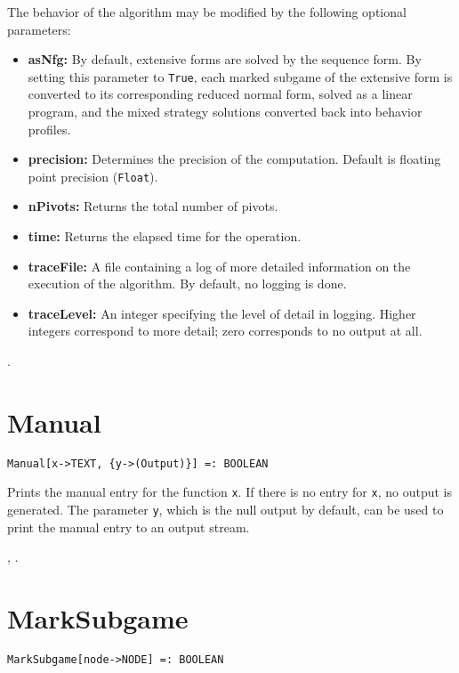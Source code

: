 The behavior of the algorithm may be modified by the following optional
parameters:
\begin{itemize}
\item
\textbf{asNfg:} By default, extensive forms are solved by the sequence form.
By setting this parameter to \verb+True+, each marked subgame of the
extensive form is converted to its corresponding reduced normal form,
solved as a linear program, and the mixed strategy solutions converted back
into behavior profiles.
\item
\textbf{precision:} Determines the precision of the computation. Default is
floating point precision (\verb+Float+). 
\item
\textbf{nPivots:} Returns the total number of pivots.
\item
\textbf{time:} Returns the elapsed time for the operation.
\item
\textbf{traceFile:} A file containing a log of more detailed information on the
execution of the algorithm.  By default, no logging is done.
\item
\textbf{traceLevel:} An integer specifying the level of detail in logging.
Higher integers correspond to more detail; zero corresponds to no
output at all.
\end{itemize}

\seealso {}.


\section*{Manual}\label{PrimManual}
\begin{verbatim}
Manual[x->TEXT, {y->(Output)}] =: BOOLEAN 
\end{verbatim}

\noindent
Prints the manual entry for the function \verb+x+.  If there is no
entry for \verb+x+, no output is generated. The parameter
\verb+y+, which is the null output by default, can be used to print
the manual entry to an output stream.

\seealso {}, .


\section*{MarkSubgame}\label{PrimMarkSubgame}
\begin{verbatim}
MarkSubgame[node->NODE] =: BOOLEAN 
\end{verbatim}

